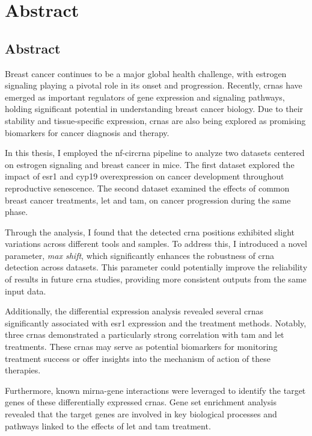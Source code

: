 \chapter{Abstract}

\section{Abstract}
Breast cancer continues to be a major global health challenge, with estrogen
signaling playing a pivotal role in its onset and progression.
Recently, \glspl{crna} have emerged as important regulators of gene expression
and signaling pathways, holding significant potential in understanding breast
cancer biology.
Due to their stability and tissue-specific expression, \glspl{crna} are also
being explored as promising biomarkers for cancer diagnosis and therapy.

In this thesis, I employed the \gls{nf-circrna} pipeline to analyze two
datasets centered on estrogen signaling and breast cancer in mice.
The first dataset explored the impact of \gls{esr1} and \gls{cyp19}
overexpression on cancer development throughout reproductive senescence.
The second dataset examined the effects of common breast cancer treatments,
\gls{let} and \gls{tam}, on cancer progression during the same phase.

Through the analysis, I found that the detected \gls{crna} positions exhibited
slight variations across different tools and samples.
To address this, I introduced a novel parameter, \textit{max shift}, which
significantly enhances the robustness of \gls{crna} detection across datasets.
This parameter could potentially improve the reliability of results in future
\gls{crna} studies, providing more consistent outputs from the same input data.

Additionally, the differential expression analysis revealed several
\glspl{crna} significantly associated with \gls{esr1} expression and the
treatment methods.
Notably, three \glspl{crna} demonstrated a particularly strong correlation with
\gls{tam} and \gls{let} treatments.
These \glspl{crna} may serve as potential biomarkers for monitoring treatment
success or offer insights into the mechanism of action of these therapies.

Furthermore, known \gls{mirna}-gene interactions were leveraged to identify the
target genes of these differentially expressed \glspl{crna}.
Gene set enrichment analysis revealed that the target genes are involved in key
biological processes and pathways linked to the effects of \gls{let} and
\gls{tam} treatment.

